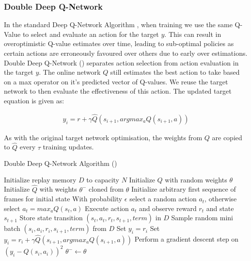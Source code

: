 \subsubsection{Double Deep Q-Network}
In the standard Deep Q-Network Algorithm , when training we use the same Q-Value to select and evaluate an action for the target $y$. This can result in overoptimistic Q-value estimates over time, leading to sub-optimal policies as certain actions are erroneously favoured over others due to early over estimations. Double Deep Q-Network (\citet{doubleq}) separates action selection from action evaluation in the target $y$. The online network $Q$ still estimates the best action to take based on a max operator on it's predicted vector of Q-values. We reuse the target network to then evaluate the effectiveness of this action. The updated target equation is given as:

\begin{align}
    \label{equ:DubTarget}
    y_i = r + \gamma \hat{Q}(s_{i+1}, argmax_aQ(s_{i+1}, a))
\end{align}

As with the original target network optimisation, the weights from $Q$ are copied to $\hat{Q}$
every $\tau$ training updates.

\begin{algorithm}
    \caption{Double Deep Q-Network Algorithm (\citet{doubleq})} \label{alg:DDQN}
    \begin{algorithmic}[1]
        \State Initialize replay memory $D$ to capacity $N$
        \State Initialize $Q$ with random weights $\theta$
        \State Initialize $\hat{Q}$ with weights $\theta^-$ cloned from $\theta$
        \State Initialize arbitrary first sequence of frames for initial state
        \State With probability $\epsilon$ select a random action $a_t$, otherwise select $a_t = max_a Q(s_t, a)$
        \State Execute action $a_t$ and observe reward $r_t$ and state $s_{t+1}$
        \State Store state transition $(s_t, a_t, r_t, s_{t+1}, term)$ in $D$
        \State Sample random mini batch $(s_i, a_i, r_i, s_{i + 1}, term)$ from $D$
        \State Set $y_i = r_i$
        \Else
        \State Set $y_i = r_i + \gamma \hat{Q}(s_{i+1}, argmax_aQ(s_{i+1}, a))$ \label{DDQN:target}
        \EndIf
        \EndFor
        \State Perform a gradient descent step on $(y_i - Q(s_i, a_i))^2$
        $\theta^- \leftarrow \theta$
        \EndIf
        \EndFor
    \end{algorithmic}
\end{algorithm}

